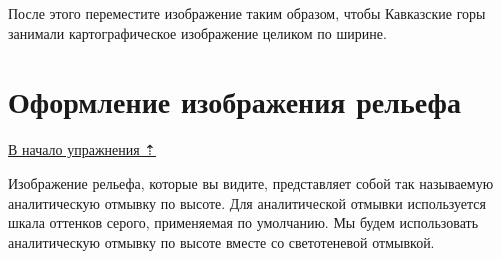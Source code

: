 \documentclass[
  12pt,
]{book}
\begin{document}
После этого переместите изображение таким образом, чтобы Кавказские горы занимали картографическое изображение целиком по ширине.

\hypertarget{map-design-general-relief}{%
\section{Оформление изображения рельефа}\label{map-design-general-relief}}

\protect\hyperlink{map-design-general}{В начало упражнения ⇡}

Изображение рельефа, которые вы видите, представляет собой так называемую аналитическую отмывку по высоте. Для аналитической отмывки используется шкала оттенков серого, применяемая по умолчанию. Мы будем использовать аналитическую отмывку по высоте вместе со светотеневой отмывкой.
\end{document}

